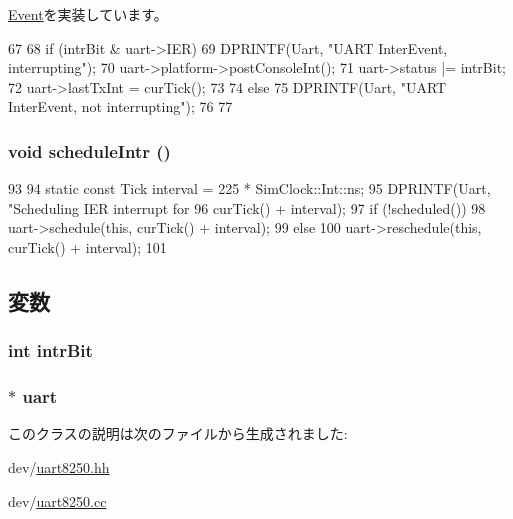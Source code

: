 \hyperlink{classEvent_a142b75b68a6291400e20fb0dd905b1c8}{Event}を実装しています。


\begin{DoxyCode}
67 {
68     if (intrBit & uart->IER) {
69        DPRINTF(Uart, "UART InterEvent, interrupting\n");
70        uart->platform->postConsoleInt();
71        uart->status |= intrBit;
72        uart->lastTxInt = curTick();
73     }
74     else
75        DPRINTF(Uart, "UART InterEvent, not interrupting\n");
76 
77 }
\end{DoxyCode}
\hypertarget{classUart8250_1_1IntrEvent_a5300e17e5d721149683cb2bac69c7571}{
\subsubsection[{scheduleIntr}]{\setlength{\rightskip}{0pt plus 5cm}void scheduleIntr ()}}
\label{classUart8250_1_1IntrEvent_a5300e17e5d721149683cb2bac69c7571}



\begin{DoxyCode}
93 {
94     static const Tick interval = 225 * SimClock::Int::ns;
95     DPRINTF(Uart, "Scheduling IER interrupt for %
96             curTick() + interval);
97     if (!scheduled())
98         uart->schedule(this, curTick() + interval);
99     else
100         uart->reschedule(this, curTick() + interval);
101 }
\end{DoxyCode}


\subsection{変数}
\hypertarget{classUart8250_1_1IntrEvent_a32a4c55ff711c0b90d74b75e1d54ebce}{
\subsubsection[{intrBit}]{\setlength{\rightskip}{0pt plus 5cm}int {\bf intrBit}}}
\label{classUart8250_1_1IntrEvent_a32a4c55ff711c0b90d74b75e1d54ebce}
\hypertarget{classUart8250_1_1IntrEvent_a79b2735a14e67de20ff110606a1c3997}{
\subsubsection[{uart}]{$\ast$ {\bf uart}}}
\label{classUart8250_1_1IntrEvent_a79b2735a14e67de20ff110606a1c3997}


このクラスの説明は次のファイルから生成されました:\begin{DoxyCompactItemize}
\item 
dev/\hyperlink{uart8250_8hh}{uart8250.hh}\item 
dev/\hyperlink{uart8250_8cc}{uart8250.cc}\end{DoxyCompactItemize}

